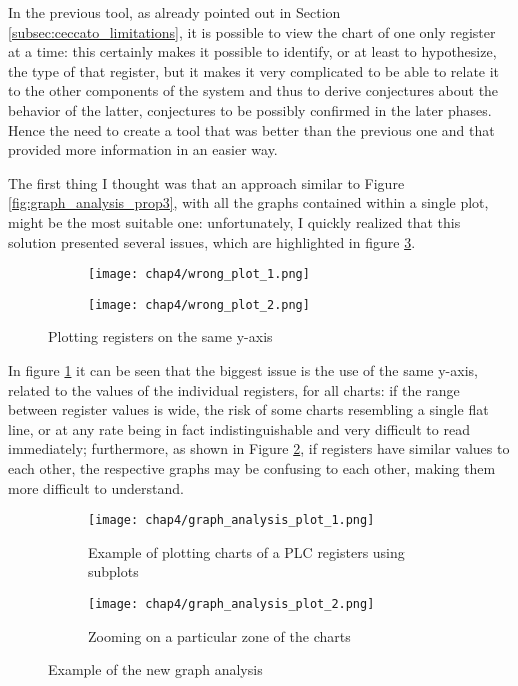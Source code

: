 \bigskip
In the previous tool, as already pointed out in Section \ref{subsec:ceccato_limitations}, it is possible to view the chart of one only register at a time: this certainly makes it possible to identify, or at least to hypothesize, the type of that register, but it makes it very complicated to be able to relate it to the other components of the system and thus to derive conjectures about the behavior of the latter, conjectures to be possibly confirmed in the later phases. Hence the need to create a tool that was better than the previous one and that provided more information in an easier way.

\bigskip
The first thing I thought was that an approach similar to Figure \ref{fig:graph_analysis_prop3}, with all the graphs contained within a single plot, might be the most suitable one: unfortunately, I quickly realized that this solution presented several issues, which are highlighted in figure \ref{fig:4_plot_comparison_1}. 

\begin{figure}[H]
	\centering
	\begin{subfigure}{0.48\textwidth}
		\texttt{[image: chap4/wrong\_plot\_1.png]}
		\caption{}
		\label{subfig:4_wrong_plot}
	\end{subfigure}
	\hfill
	\begin{subfigure}{0.48\textwidth}
		\texttt{[image: chap4/wrong\_plot\_2.png]}
		\caption{}
		\label{subfig:4_wrong_plot_zoom}
	\end{subfigure}
	\caption{Plotting registers on the same y-axis}
	\label{fig:4_plot_comparison_1}
\end{figure}
In figure \ref{subfig:4_wrong_plot} it can be seen that the biggest issue is the use of the same y-axis, related to the values of the individual registers, for all charts: if the range between register values is wide, the risk of some charts resembling a single flat line, or at any rate being in fact indistinguishable and very difficult to read immediately; furthermore, as shown in Figure \ref{subfig:4_wrong_plot_zoom}, if registers have similar values to each other, the respective graphs may be confusing to each other, making them more difficult to understand.

\begin{figure}[ht]
	\centering
	\begin{subfigure}{0.9\textwidth}
		\texttt{[image: chap4/graph\_analysis\_plot\_1.png]}
		\caption{Example of plotting charts of a PLC registers using subplots}
		\label{subfig:4_graph_analysis_1}
	\end{subfigure}
	\hfill
	\begin{subfigure}{0.9\textwidth}
		\texttt{[image: chap4/graph\_analysis\_plot\_2.png]}
		\caption{Zooming on a particular zone of the charts}
		\label{subfig:4_graph_analysis_2}
	\end{subfigure}
	\caption{Example of the new graph analysis}
	\label{fig:4_graph_analysis}
\end{figure}

